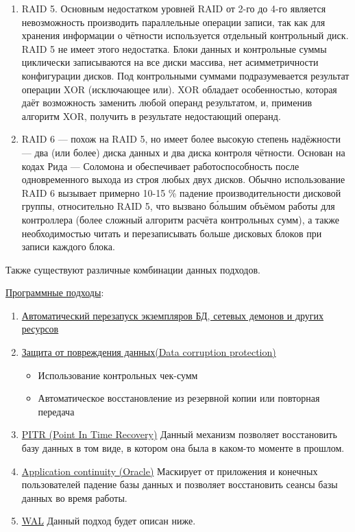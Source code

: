 \begin{enumerate}
\begin{enumerate}
         \item RAID 5. Основным недостатком уровней RAID от 2-го до 4-го является невозможность производить параллельные операции записи, так как для хранения информации о чётности используется отдельный контрольный диск. RAID 5 не имеет этого недостатка. Блоки данных и контрольные суммы циклически записываются на все диски массива, нет асимметричности конфигурации дисков. Под контрольными суммами подразумевается результат операции XOR (исключающее или). XOR обладает особенностью, которая даёт возможность заменить любой операнд результатом, и, применив алгоритм XOR, получить в результате недостающий операнд.
         \item RAID 6 — похож на RAID 5, но имеет более высокую степень надёжности — два (или более) диска данных и два диска контроля чётности. Основан на кодах Рида — Соломона и обеспечивает работоспособность после одновременного выхода из строя любых двух дисков. Обычно использование RAID 6 вызывает примерно 10-15 \% падение производительности дисковой группы, относительно RAID 5, что вызвано б\'{о}льшим объёмом работы для контроллера (более сложный алгоритм расчёта контрольных сумм), а также необходимостью читать и перезаписывать больше дисковых блоков при записи каждого блока.
     \end{enumerate}
     Также существуют различные комбинации данных подходов.
\end{enumerate}
\underline{Программные подходы}:
\begin{enumerate}
    \item \underline{Автоматический перезапуск экземпляров БД, сетевых демонов и других ресурсов}
    \item \underline{Защита от повреждения данных(Data corruption protection)}
    \begin{itemize}
        \item Использование контрольных чек-сумм
        \item Автоматическое восстановление из резервной копии или повторная передача
    \end{itemize}
    \item \underline{PITR (Point In Time Recovery)} Данный механизм позволяет восстановить базу данных в том виде, в котором она была в каком-то моменте в прошлом.
    \item \underline{Application continuity (Oracle)} Маскирует от приложения и конечных пользователей падение базы данных и позволяет восстановить сеансы базы данных во время работы.
    \item \underline{WAL} Данный подход будет описан ниже.
\end{enumerate}
